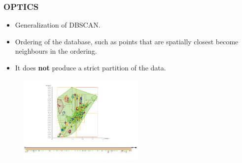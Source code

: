 \documentclass[hyperref={pdfpagelabels=true}]{beamer}
\begin{document}

\begin{frame}
\frametitle{OPTICS}
\begin{itemize}%
      \item<2->Generalization of DBSCAN.%
      \item<3->Ordering of the database, such as points that are spatially closest become neighbours in the ordering.
      \item<4->It does \textbf{not} produce a strict partition of the data.%
\end{itemize}                
  \begin{figure}   
    \includegraphics[width=0.55\textwidth]{optics_diag.png}   
  \end{figure}     
\end{frame}
\end{document}
